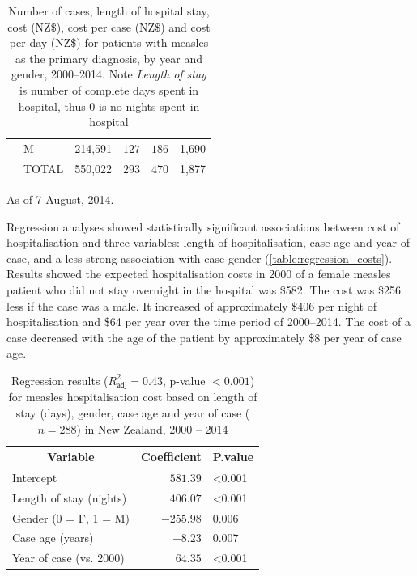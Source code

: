 \documentclass{article}
\begin{document}
\begin{table}
\begin{center}
\begin{tabular}{lllrrl}
&     M&214,591&$127$&$186$&1,690\tabularnewline
&TOTAL&550,022&$293$&$470$&1,877\tabularnewline
\hline
\end{tabular}\end{center}\caption{Number of cases, length of hospital stay, cost (NZ\$), cost per case (NZ\$) and cost per day (NZ\$) for patients with measles as the primary diagnosis, by year and gender, 2000--2014. Note \textit{Length of stay} is number of complete days spent in hospital, thus 0 is no nights spent in hospital}
\label{table:cases}
 \centering
 \begin{tablenotes}
      \small
      \item As of 7 August, 2014.
    \end{tablenotes}
\end{table}

Regression analyses showed statistically significant associations between cost of hospitalisation and three variables: length of hospitalisation, case age and year of case, and a less strong association with case gender (\autoref{table:regression_costs}). Results showed the expected hospitalisation costs in 2000 of a female measles patient who did not stay overnight in the hospital was \$582.  The cost was \$256 less if the case was a male. It increased of approximately \$406 per night of hospitalisation and \$64 per year over the time period of 2000--2014. The cost of a case decreased with the age of the patient by approximately \$8 per year of case age.

\begin{table}
\begin{center}
\begin{tabular}{lrl}
\hline\hline
\multicolumn{1}{c}{Variable}&\multicolumn{1}{c}{Coefficient}&\multicolumn{1}{c}{P.value}\tabularnewline
\hline
Intercept&$ 581.39$&\textless 0.001\tabularnewline
Length of stay (nights)&$ 406.07$&\textless 0.001\tabularnewline
Gender (0 = F, 1 = M)&$-255.98$&0.006\tabularnewline
Case age (years)&$  -8.23$&0.007\tabularnewline
Year of case (vs. 2000)&$  64.35$&\textless 0.001\tabularnewline
\hline
\end{tabular}\end{center}\caption{Regression results ($R^{2}_\textsf{adj} = 0.43$, p-value $<0.001$) for measles hospitalisation cost based on length of stay (days), gender, case age and year of case ($n=288$) in New Zealand, 2000 -- 2014}
\label{table:regression_costs}
\end{table}
\end{document}
